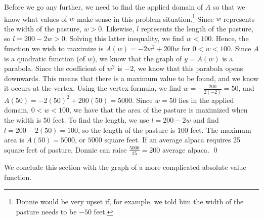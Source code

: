 \begin{ex}
\medskip

Before we go any further, we need to find the applied domain of $A$ so that we know what values of $w$ make sense in this problem situation.\footnote{Donnie would be very upset if, for example, we told him the width of the pasture needs to be $-50$ feet.}  Since $w$ represents the width of the pasture, $w > 0$.  Likewise, $l$ represents the length of the pasture, so $l = 200-2w > 0$.  Solving this latter inequality, we find $w < 100$.  Hence, the function we wish to maximize is $A(w) = -2w^2 + 200w$ for $0 < w < 100$.  Since $A$ is a quadratic function (of $w$), we know that the graph of $y = A(w)$ is a parabola.  Since the coefficient of $w^2$ is $-2$, we know that this parabola opens downwards.  This means that there is a maximum value to be found, and we know it occurs at the vertex.  Using the vertex formula, we find $w = -\frac{200}{2(-2)} = 50$, and $A(50) = -2(50)^2 + 200(50) = 5000$.  Since $w=50$ lies in the applied domain, $0 < w < 100$, we have that the area of the pasture is maximized when the width is $50$ feet.  To find the length, we use $l = 200-2w$ and find $l = 200-2(50) = 100$, so the length of the pasture is $100$ feet.  The maximum area is $A(50) = 5000$, or $5000$ square feet.  If an average alpaca requires 25 square feet of pasture, Donnie can raise $\frac{5000}{25} = 200$ average alpaca. \qed



\end{ex}

We conclude this section with the graph of a more complicated absolute value function.

